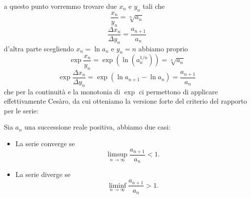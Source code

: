 \documentclass[11pt]{scrartcl}
\begin{document}
	a questo punto vorremmo trovare due $x_n$ e $y_n$ tali che 
	$$\frac{x_n}{y_n}=\sqrt[n]{a_n}$$
	$$\frac{\Delta x_n}{\Delta y_n}=\frac{a_{n+1}}{a_n}$$
	d'altra parte scegliendo $x_n=\ln a_n$ e $y_n=n$ abbiamo proprio
	$$\exp\frac{x_n}{y_n}=\exp\left(\ln \left(a_n^{1/n}\right)\right)=\sqrt[n]{a_n}$$
	$$\exp \frac{\Delta x_n}{\Delta y_n}=\exp \left(\ln a_{n+1}-\ln a_n\right)=\frac{a_{n+1}}{a_n}$$ 
	che per la continuità e la monotonia di $\exp$ ci permettono di applicare effettivamente Cesàro, da cui otteniamo la versione forte del criterio del rapporto per le serie:
	\begin{theorem}
		Sia $a_n$ una successione reale positiva, abbiamo due casi:
		\begin{itemize}
			\item La serie converge se 
			$$\limsup_{n\to\infty}\frac{a_{n+1}}{a_n}<1.$$
			\item La serie diverge se 
			$$\liminf_{n\to\infty}\frac{a_{n+1}}{a_n}>1.$$
		\end{itemize}
	\end{theorem}
\end{document}
